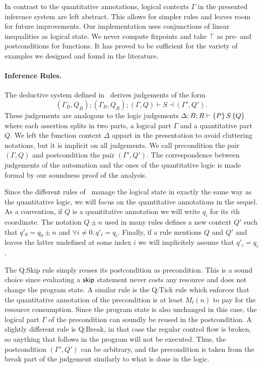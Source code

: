 \documentclass[nocopyrightspace,preprint]{sigplanconf}
\newcommand{\pref}[1]{\prettyref{#1}}
\begin{document}
In contrast to the quantitative annotations, logical contexts $\Gamma$
in the presented inference system are left abstract.  This allows for
simpler rules and leaves room for future improvements.
%
Our implementation uses conjunctions of linear inequalities as
logical state.  We never compute fixpoints and take $\top$
as pre- and postconditions for functions. It has proved to be
sufficient for the variety of examples we designed and found
in the literature.


\paragraph{Inference Rules.}

The deductive system defined in~\pref{fig:auto} derives
judgements of the form
$$
  (\Gamma_B, Q_B); (\Gamma_R, Q_R);
    (\Gamma, Q) \vdash S \dashv (\Gamma', Q').
$$
These judgements are analogous to the logic judgements
$\Delta; B; R \vdash \{P\}\, S\, \{Q\}$ where each assertion
splits in two parts, a logical part $\Gamma$ and a quantitative
part $Q$.  We left the function context $\Delta$ appart in
the presentation to avoid cluttering notations, but it is
implicit on all judgements.  We call precondition the pair
$(\Gamma, Q)$ and postcondition the pair $(\Gamma', Q')$.
The correspondence between judgements of the automation
and the ones of the quantitative logic is made formal by our
soundness proof of the analysis.

Since the different rules of~\pref{fig:auto} manage the
logical state in exactly the same way as the quantitative
logic, we will focus on the quantitative annotations in the
sequel.
%
As a convention, if $Q$ is a quantitative annotation we
will write $q_i$ for its $i$th coordinate.  The notation
$Q \pm n$ used in many rules defines a new context $Q'$
such that $q'_0 = q_0 \pm n$ and $\forall i \neq 0 .\,
q'_i = q_i$.  Finally, if a rule mentions $Q$ and $Q'$
and leaves the latter undefined at some index $i$ we
will implicitely assume that $q'_i = q_i$.

%
%

The {\sc Q:Skip} rule simply reuses its postcondition as
precondition.  This is a sound choice since evaluating
a $\mathsf{skip}$ statement never costs any resource and
does not change the program state.  A similar rule is
the {\sc Q:Tick} rule which enforces that the quantitative
annotation of the precondition is at least $M_t(n)$ to
pay for the resource consumption.  Since the program
state is also unchanged in this case, the logical part
$\Gamma$ of the precondition can soundly be reused in
the postcondition.  A slightly different rule is
{\sc Q:Break}, in that case the regular control flow is
broken, so anything that follows  in the
program will not be executed.  Thus, the postcondition
$(\Gamma', Q')$ can be arbitrary, and the precondition
is taken from the break part of the judgement similarly
to what is done in the logic.
\end{document}
